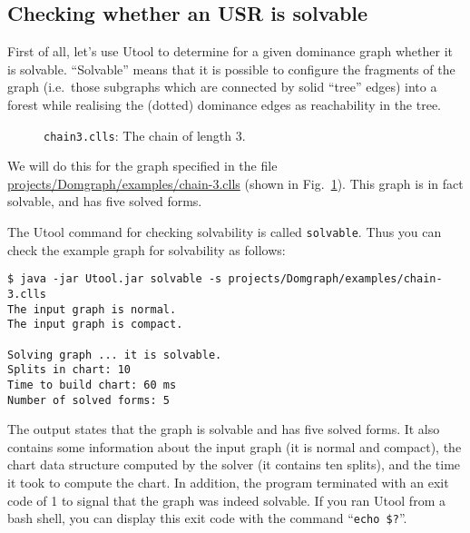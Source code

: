 \subsection{Checking whether an USR is solvable}

First of all, let's use Utool to determine for a given dominance graph
whether it is solvable. ``Solvable'' means that it is possible to
configure the fragments of the graph (i.e.\ those subgraphs which are
connected by solid ``tree'' edges) into a forest while realising the
(dotted) dominance edges as reachability in the tree.

\begin{figure}
\caption{\texttt{chain3.clls}: The chain of length 3.
\label{fig:chain3}}
\end{figure}

We will do this for the graph specified in the file
\url{projects/Domgraph/examples/chain-3.clls} (shown in
Fig.~\ref{fig:chain3}). This graph is in fact solvable, and has five
solved forms.

The Utool command for checking solvability is called
\verb?solvable?. Thus you can check the example graph for solvability
as follows:

\begin{verbatim}
$ java -jar Utool.jar solvable -s projects/Domgraph/examples/chain-3.clls
The input graph is normal.
The input graph is compact.

Solving graph ... it is solvable.
Splits in chart: 10
Time to build chart: 60 ms
Number of solved forms: 5
\end{verbatim}

The output states that the graph is solvable and has five solved
forms. It also contains some information about the input graph (it is
normal and compact), the chart data structure computed by the solver
(it contains ten splits), and the time it took to compute the
chart. In addition, the program terminated with an exit code of 1 to
signal that the graph was indeed solvable. If you ran Utool from a
bash shell, you can display this exit code with the command
``\verb!echo $?!''. %

